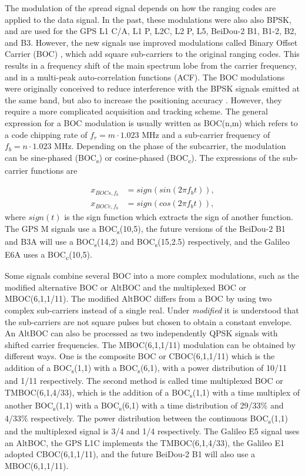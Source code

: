 \documentclass[openany,10pt,twoside,a4paper]{book}
\begin{document}
The modulation of the spread signal depends on how the ranging codes are applied to the data signal. In the past, these modulations were also also BPSK, and are used for the GPS L1 C/A, L1 P, L2C, L2 P, L5, BeiDou-2 B1, B1-2, B2, and B3. However, the new signals use improved modulations called Binary Offset Carrier (BOC) \cite{Betz2001}, which add square sub-carriers to the original ranging codes. This results in a frequency shift of the main spectrum lobe from the carrier frequency, and in a multi-peak auto-correlation functions (ACF). The BOC modulations were originally conceived to reduce interference with the BPSK signals emitted at the same band, but also to increase the positioning accuracy \cite{AvilaPHD}. However, they require a more complicated acquisition and tracking scheme. The general expression for a BOC modulation is usually written as BOC(n,m) which refers to a code chipping rate of $f_r = m\cdot1.023$ MHz and a sub-carrier frequency of $f_b = n\cdot1.023$ MHz. Depending on the phase of the subcarrier, the modulation can be sine-phased (BOC\textsubscript{s}) or cosine-phased (BOC\textsubscript{c}). The expressions of the sub-carrier functions are

\begin{equation} 
\begin{aligned}
x_{BOCs,f_b} &= sign\left( sin \left( 2\pi f_b t \right) \right), \\
x_{BOCc,f_b} &= sign\left( cos \left( 2\pi f_b t \right) \right),
\end{aligned}
\end{equation}
where $sign\left(t \right)$ is the sign function which extracts the sign of another function. The GPS M signals use a BOC\textsubscript{s}(10,5), the future versions of the BeiDou-2 B1 and B3A will use a BOC\textsubscript{s}(14,2) and BOC\textsubscript{s}(15,2.5) respectively, and the Galileo E6A uses a BOC\textsubscript{c}(10,5). 

Some signals combine several BOC into a more complex modulations, such as the modified alternative BOC or AltBOC and the multiplexed BOC or MBOC(6,1,1/11). The modified AltBOC differs from a BOC by using two complex sub-carriers instead of a single real. Under \textit{modified} it is understood that the sub-carriers are not square pulses but chosen to obtain a constant envelope. An AltBOC can also be processed as two independently QPSK signals with shifted carrier frequencies. The MBOC(6,1,1/11) modulation can be obtained by different ways. One is the composite BOC or CBOC(6,1,1/11) which is the addition of a BOC\textsubscript{s}(1,1) with a BOC\textsubscript{s}(6,1), with a power distribution of 10/11 and 1/11 respectively. The second method is called time multiplexed BOC or TMBOC(6,1,4/33), which is the addition of a BOC\textsubscript{s}(1,1) with a time multiplex of another BOC\textsubscript{s}(1,1) with a BOC\textsubscript{s}(6,1) with a time distribution of 29/33\% and 4/33\% respectively. The power distribution between the continuous BOC\textsubscript{s}(1,1) and the multiplexed signal is 3/4 and 1/4 respectively. The Galileo E5 signal uses an AltBOC, the GPS L1C implements the TMBOC(6,1,4/33), the Galileo E1 adopted CBOC(6,1,1/11), and the future BeiDou-2 B1 will also use a MBOC(6,1,1/11).
\end{document}
